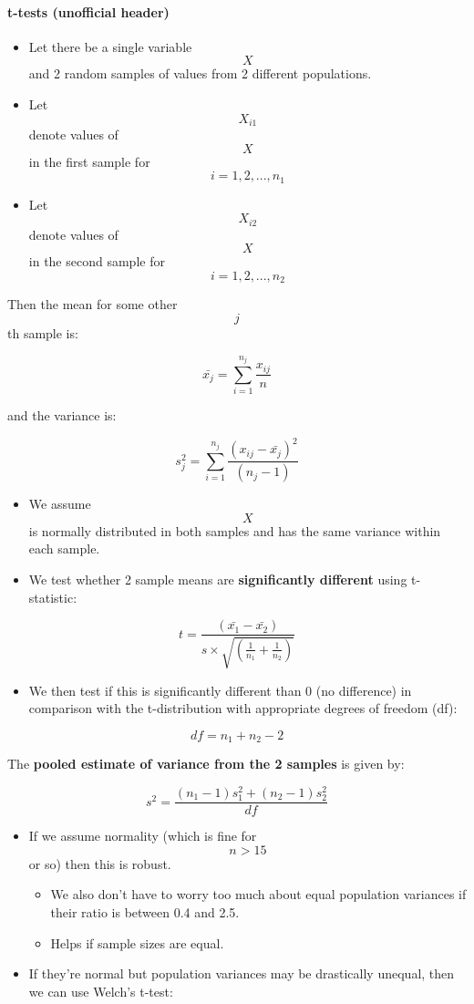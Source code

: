 \documentclass[]{article}
\providecommand{\tightlist}{%
  \setlength{\itemsep}{0pt}\setlength{\parskip}{0pt}}
\let\oldparagraph\paragraph
\renewcommand{\paragraph}[1]{\oldparagraph{#1}\mbox{}}
\begin{document}
\hypertarget{t-tests-unofficial-header}{%
\paragraph{t-tests (unofficial
header)}\label{t-tests-unofficial-header}}

\begin{itemize}
\tightlist
\item
  Let there be a single variable \[X\] and 2 random samples of values
  from 2 different populations.
\item
  Let \[X_{i1}\] denote values of \[X\] in the first sample for
  \[i = 1,2,...,n_1\]
\item
  Let \[X_{i2}\]denote values of \[X\] in the second sample for
  \[i = 1,2,...,n_2\]
\end{itemize}

Then the mean for some other \[j\]th sample is:

\[\bar{x_j} = \sum_{i = 1}^{n_j} \frac{x_{ij}}{n}\]

and the variance is:

\[s_j^2 = \sum_{i = 1}^{n_j} \frac{(x_{ij} - \bar{x_j})^2}{(n_j - 1)}\]

\begin{itemize}
\tightlist
\item
  We assume \[X\] is normally distributed in both samples and has the
  same variance within each sample.
\item
  We test whether 2 sample means are \textbf{significantly different}
  using t-statistic:
\end{itemize}

\[t = \frac{(\bar{x_1} - \bar{x_2})}{s \times \sqrt{(\frac{1}{n_1} + \frac{1}{n_2})}}\]

\begin{itemize}
\tightlist
\item
  We then test if this is significantly different than 0 (no difference)
  in comparison with the t-distribution with appropriate degrees of
  freedom (df):
\end{itemize}

\[ df = n_1 + n_2 - 2 \]

The \textbf{pooled estimate of variance from the 2 samples} is given by:

\[s^2 = \frac{(n_1 - 1)s_1^2 + (n_2 - 1)s_2^2}{df}\]

\begin{itemize}
\tightlist
\item
  If we assume normality (which is fine for \[ n > 15 \] or so) then
  this is robust.

  \begin{itemize}
  \tightlist
  \item
    We also don't have to worry too much about equal population
    variances if their ratio is between 0.4 and 2.5.
  \item
    Helps if sample sizes are equal.
  \end{itemize}
\item
  If they're normal but population variances may be drastically unequal,
  then we can use Welch's t-test:
\end{itemize}
\end{document}
